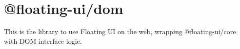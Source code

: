 \chapter{@floating-\/ui/dom}
\hypertarget{md__2home_2solype_2delivery_2current__days_2trello_2front_2node__modules_2_0dfloating-ui_2dom_2README}{}\label{md__2home_2solype_2delivery_2current__days_2trello_2front_2node__modules_2_0dfloating-ui_2dom_2README}
\label{md__2home_2solype_2delivery_2current__days_2trello_2front_2node__modules_2_0dfloating-ui_2dom_2README_autotoc_md7879}%
%
 This is the library to use Floating UI on the web, wrapping {\ttfamily @floating-\/ui/core} with DOM interface logic. 